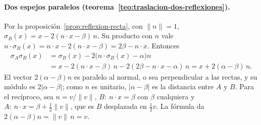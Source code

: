 \paragraph{Dos espejos paralelos (teorema~\ref{teo:traslacion-dos-reflexiones}).}
\begin{demostracion}
Por la proposición~\ref{prop:reflexion-recta}, con \(\lVert n\rVert=1\),
\(\sigma_{B}(x)=x-2(n\cdot x-\beta)\,n\). Su producto con \(n\) vale
\(n\cdot\sigma_{B}(x)=n\cdot x-2(n\cdot x-\beta)=2\beta-n\cdot x\). Entonces
\[
\begin{aligned}
  \sigma_{A}\sigma_{B}(x)
  &=\sigma_{B}(x)-2\bigl(n\cdot\sigma_{B}(x)-\alpha\bigr)n\\
  &=x-2(n\cdot x-\beta)\,n-2(2\beta-n\cdot x-\alpha)\,n
   =x+2(\alpha-\beta)\,n .
\end{aligned}
\]
El vector \(2(\alpha-\beta)n\) es paralelo al normal, o sea perpendicular a las rectas, y su
módulo es \(2|\alpha-\beta|\); como \(n\) es unitario, \(|\alpha-\beta|\) es la distancia entre
\(A\) y \(B\). Para el recíproco, sea \(n=v/\lVert v\rVert\), \(B:\ n\cdot x=\beta\) con \(\beta\)
cualquiera y \(A:\ n\cdot x=\beta+\frac12\lVert v\rVert\), que es \(B\) desplazada en
\(\frac12v\). La fórmula da \(2(\alpha-\beta)n=\lVert v\rVert\,n=v\).
\end{demostracion}

